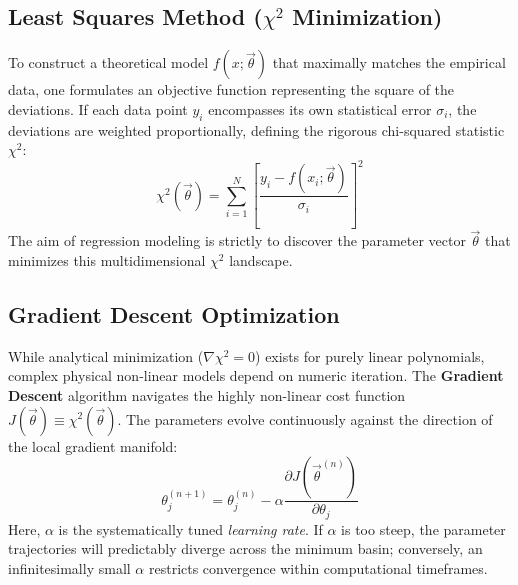\documentclass[aps, reprint, twocolumn, superscriptaddress, floatfix]{revtex4-2}
\begin{document}
\subsection{Least Squares Method ($\chi^2$ Minimization)}
To construct a theoretical model $f(x; \vec{\theta})$ that maximally matches the empirical data, one formulates an objective function representing the square of the deviations. If each data point $y_i$ encompasses its own statistical error $\sigma_i$, the deviations are weighted proportionally, defining the rigorous chi-squared statistic $\chi^2$:
\begin{equation}
    \chi^2(\vec{\theta}) = \sum_{i=1}^{N} \left[ \frac{y_i - f(x_i; \vec{\theta})}{\sigma_i} \right]^2
\end{equation}
The aim of regression modeling is strictly to discover the parameter vector $\vec{\theta}$ that minimizes this multidimensional $\chi^2$ landscape. 

\subsection{Gradient Descent Optimization}
While analytical minimization ($\nabla \chi^2 = 0$) exists for purely linear polynomials, complex physical non-linear models depend on numeric iteration. The \textbf{Gradient Descent} algorithm navigates the highly non-linear cost function $J(\vec{\theta}) \equiv \chi^2(\vec{\theta})$. The parameters evolve continuously against the direction of the local gradient manifold:
\begin{equation}
    \theta_j^{(n+1)} = \theta_j^{(n)} - \alpha \frac{\partial J(\vec{\theta}^{(n)})}{\partial \theta_j}
\end{equation}
Here, $\alpha$ is the systematically tuned \textit{learning rate}. If $\alpha$ is too steep, the parameter trajectories will predictably diverge across the minimum basin; conversely, an infinitesimally small $\alpha$ restricts convergence within computational timeframes.
\end{document}
